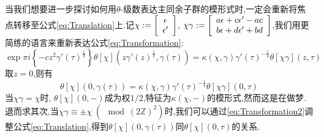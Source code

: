 当我们想要进一步探讨如何用$\theta$-级数表达主同余子群的模形式时,一定会重新将焦点转移至公式\ref{eq:Translation}上.记$\chi:=\left[\begin{array}{c}{\epsilon} \\ {\epsilon'}\end{array}\right]$, $\chi\gamma:=\left[\begin{array}{c}{a\epsilon+c\epsilon'-ac} \\ {b\epsilon+d\epsilon'+bd}\end{array}\right]$,我们用更简练的语言来重新表达公式\ref{eq:Transformation}:
$$\exp \pi i \left\{ -cz^2\gamma'(\tau)^{\frac{1}{2}} \right\}\theta[\chi](z\gamma'(z)^{\frac{1}{2}},\gamma(\tau))=\kappa(\chi,\gamma)\gamma'(\tau)^{-\frac{1}{4}} \theta[\chi\gamma] (z,\tau)$$
取$z=0$,则有
\begin{equation}\label{eq:Transformation3}
\theta[\chi](0,\gamma(\tau))=\kappa(\chi,\gamma)\gamma'(\tau)^{-\frac{1}{4}} \theta[\chi\gamma] (0,\tau)
\end{equation}
当$\chi \gamma=\chi$时, $\theta[\chi](0,-)$成为权$1/2$,特征为$\kappa(\chi,-)$的模形式,然而这是在做梦.退而求其次,当$\chi\gamma \equiv \pm \chi \;(\!\!\!\!\mod (2\mathbb{Z})^2)$时,我们可以通过\ref{eq:Transformation2}调整公式\ref{eq:Translation},得到$\theta[\chi](0,\gamma(\tau))$同$\theta[\chi](0,\tau)$的关系.
